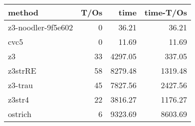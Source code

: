 \begin{tabular}{lrrr}
\hline
 method             &   T/Os &    time &   time-T/Os \\
\hline
 z3-noodler-9f5e602 &      0 &   36.21 &       36.21 \\
 cvc5               &      0 &   11.69 &       11.69 \\
 z3                 &     33 & 4297.05 &      337.05 \\
 z3strRE            &     58 & 8279.48 &     1319.48 \\
 z3-trau            &     45 & 7827.56 &     2427.56 \\
 z3str4             &     22 & 3816.27 &     1176.27 \\
 ostrich            &      6 & 9323.69 &     8603.69 \\
\hline
\end{tabular}
